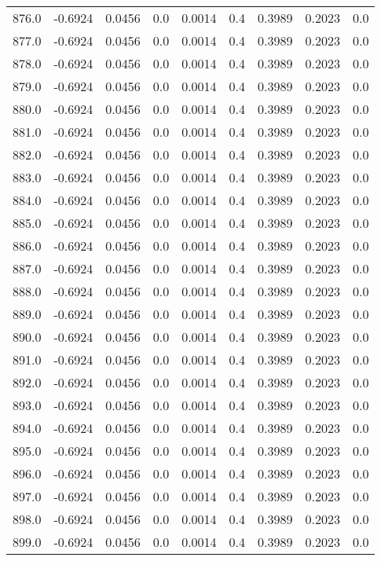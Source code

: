 \begin{longtable}{lrrrrrrrr}
876.0 & -0.6924 & 0.0456 & 0.0 & 0.0014 & 0.4 & 0.3989 & 0.2023 & 0.0 \\
877.0 & -0.6924 & 0.0456 & 0.0 & 0.0014 & 0.4 & 0.3989 & 0.2023 & 0.0 \\
878.0 & -0.6924 & 0.0456 & 0.0 & 0.0014 & 0.4 & 0.3989 & 0.2023 & 0.0 \\
879.0 & -0.6924 & 0.0456 & 0.0 & 0.0014 & 0.4 & 0.3989 & 0.2023 & 0.0 \\
880.0 & -0.6924 & 0.0456 & 0.0 & 0.0014 & 0.4 & 0.3989 & 0.2023 & 0.0 \\
881.0 & -0.6924 & 0.0456 & 0.0 & 0.0014 & 0.4 & 0.3989 & 0.2023 & 0.0 \\
882.0 & -0.6924 & 0.0456 & 0.0 & 0.0014 & 0.4 & 0.3989 & 0.2023 & 0.0 \\
883.0 & -0.6924 & 0.0456 & 0.0 & 0.0014 & 0.4 & 0.3989 & 0.2023 & 0.0 \\
884.0 & -0.6924 & 0.0456 & 0.0 & 0.0014 & 0.4 & 0.3989 & 0.2023 & 0.0 \\
885.0 & -0.6924 & 0.0456 & 0.0 & 0.0014 & 0.4 & 0.3989 & 0.2023 & 0.0 \\
886.0 & -0.6924 & 0.0456 & 0.0 & 0.0014 & 0.4 & 0.3989 & 0.2023 & 0.0 \\
887.0 & -0.6924 & 0.0456 & 0.0 & 0.0014 & 0.4 & 0.3989 & 0.2023 & 0.0 \\
888.0 & -0.6924 & 0.0456 & 0.0 & 0.0014 & 0.4 & 0.3989 & 0.2023 & 0.0 \\
889.0 & -0.6924 & 0.0456 & 0.0 & 0.0014 & 0.4 & 0.3989 & 0.2023 & 0.0 \\
890.0 & -0.6924 & 0.0456 & 0.0 & 0.0014 & 0.4 & 0.3989 & 0.2023 & 0.0 \\
891.0 & -0.6924 & 0.0456 & 0.0 & 0.0014 & 0.4 & 0.3989 & 0.2023 & 0.0 \\
892.0 & -0.6924 & 0.0456 & 0.0 & 0.0014 & 0.4 & 0.3989 & 0.2023 & 0.0 \\
893.0 & -0.6924 & 0.0456 & 0.0 & 0.0014 & 0.4 & 0.3989 & 0.2023 & 0.0 \\
894.0 & -0.6924 & 0.0456 & 0.0 & 0.0014 & 0.4 & 0.3989 & 0.2023 & 0.0 \\
895.0 & -0.6924 & 0.0456 & 0.0 & 0.0014 & 0.4 & 0.3989 & 0.2023 & 0.0 \\
896.0 & -0.6924 & 0.0456 & 0.0 & 0.0014 & 0.4 & 0.3989 & 0.2023 & 0.0 \\
897.0 & -0.6924 & 0.0456 & 0.0 & 0.0014 & 0.4 & 0.3989 & 0.2023 & 0.0 \\
898.0 & -0.6924 & 0.0456 & 0.0 & 0.0014 & 0.4 & 0.3989 & 0.2023 & 0.0 \\
899.0 & -0.6924 & 0.0456 & 0.0 & 0.0014 & 0.4 & 0.3989 & 0.2023 & 0.0 \\

\end{longtable}
